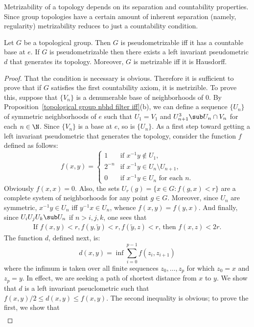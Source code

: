 Metrizability of a topology depends on its separation and countability
properties. Since group topologies have a certain amount of inherent separation (namely, regularity) metrizability reduces to just a countability condition.
\begin{theorem}\label{topological group pseudometrizable iff}
Let $G$ be a topological group. Then $G$ is pseudometrizable iff it has a countable base at $e$. If $G$ is pseudometrizable then there exists a left invariant pseudometric $d$ that generates its topology. Moreover, $G$ is metrizable iff it is Hausdorff.
\end{theorem}
\begin{proof}
That the condition is necessary is obvious. Therefore it is sufficient to prove that if $G$ satisfies the first countability axiom, it is metrizible. To prove this, suppose that $\{V_n\}$ is a denumerable base of neighborhoods of $0$. By Proposition~\ref{topological group nbhd filter iff}(b), we can define a sequence $\{U_n\}$ of symmetric neighborhoods of $e$ such that $U_1=V_1$ and $U_{n+1}^3\sub U_n\cap V_n$ for each $n\in\N$. Since $\{V_n\}$ is a base at $e$, so is $\{U_n\}$. As a first step toward getting a left invariant pseudometric that generates the topology, consider the function $f$ defined as follows:
\[f(x,y)=\begin{cases}
1&\text{if }x^{-1}y\notin U_1,\\
2^{-n}&\text{if $x^{-1}y\in U_{n}\setminus U_{n+1}$},\\
0&\text{if $x^{-1}y\in U_n$ for each $n$}.
\end{cases}\]
Obviously $f(x,x)=0$. Also, the sets $U_r(g)=\{x\in G:f(g,x)<r\}$ are a
complete system of neighborhoods for any point $g\in G$. Moreover, since $U_n$ are symmetric, $x^{-1}y\in U_n$ iff $y^{-1}x\in U_n$, whence $f(x,y)=f(y,x)$. And finally, since $U_{i}U_jU_k\sub U_n$ if $n>i,j,k$, one sees that
\begin{align}\label{topological group pseudometrizable iff-1}
\text{If $f(x,y)<r,f(y,\tilde{y})<r,f(\tilde{y},z)<r$, then $f(x,z)<2r$}.
\end{align}
The function $d$, defined next, is:
\[d(x,y)=\inf\sum_{i=0}^{p-1}f(z_i,z_{i+1})\]
where the infimum is taken over all finite sequences $z_0,\dots,z_p$ for which $z_0=x$ and $z_p=y$. In effect, we are seeking a path of shortest distance from $x$ to $y$. We show that $d$ is a left invariant pseuclometric such that $f(x,y)/2\leq d(x,y)\leq f(x,y)$. The second inequality is obvious; to prove the first, we show that
\begin{align}\label{topological group pseudometrizable iff-2}

\end{align}
\end{proof}
